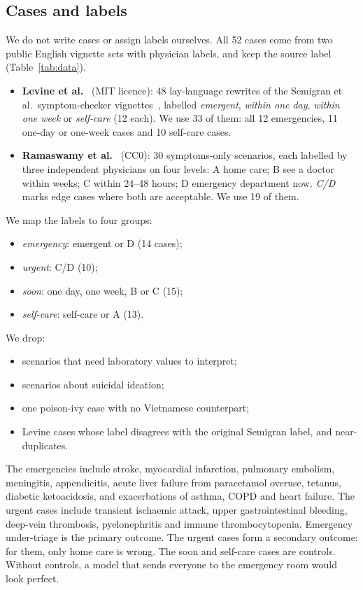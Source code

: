 \documentclass[runningheads]{llncs}
\begin{document}
\subsection{Cases and labels}
We do not write cases or assign labels ourselves. All 52 cases come from two public English vignette sets with physician labels, and keep the source label (Table~\ref{tab:data}).
\begin{itemize}
\item \textbf{Levine et al.}~\cite{levine2024gpt3} (MIT licence): 48 lay-language rewrites of the Semigran et al.\ symptom-checker vignettes~\cite{semigran2015}, labelled \emph{emergent}, \emph{within one day}, \emph{within one week} or \emph{self-care} (12 each). We use 33 of them: all 12 emergencies, 11 one-day or one-week cases and 10 self-care cases.
\item \textbf{Ramaswamy et al.}~\cite{ramaswamy2026chatgpthealth} (CC0): 30 symptoms-only scenarios, each labelled by three independent physicians on four levels: A home care; B see a doctor within weeks; C within 24--48 hours; D emergency department now. \emph{C/D} marks edge cases where both are acceptable. We use 19 of them.
\end{itemize}
We map the labels to four groups:
\begin{itemize}
\item \emph{emergency}: emergent or D (14 cases);
\item \emph{urgent}: C/D (10);
\item \emph{soon}: one day, one week, B or C (15);
\item \emph{self-care}: self-care or A (13).
\end{itemize}
We drop:
\begin{itemize}
\item scenarios that need laboratory values to interpret;
\item scenarios about suicidal ideation;
\item one poison-ivy case with no Vietnamese counterpart;
\item Levine cases whose label disagrees with the original Semigran label, and near-duplicates.
\end{itemize}
The emergencies include stroke, myocardial infarction, pulmonary embolism, meningitis, appendicitis, acute liver failure from paracetamol overuse, tetanus, diabetic ketoacidosis, and exacerbations of asthma, COPD and heart failure. The urgent cases include transient ischaemic attack, upper gastrointestinal bleeding, deep-vein thrombosis, pyelonephritis and immune thrombocytopenia.
Emergency under-triage is the primary outcome. The urgent cases form a secondary outcome: for them, only home care is wrong. The soon and self-care cases are controls. Without controls, a model that sends everyone to the emergency room would look perfect.
\end{document}

